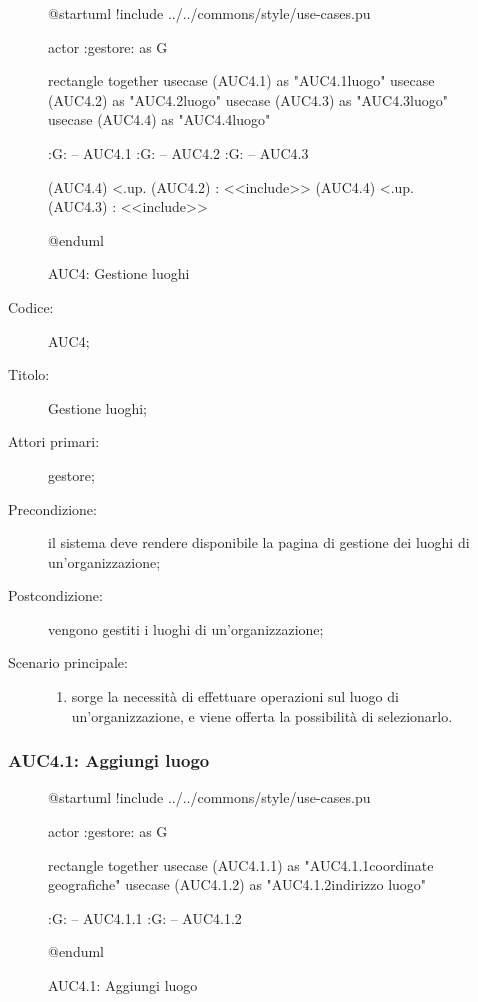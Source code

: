 
\begin{figure}[H]
  \centering
  \begin{plantuml}
  @startuml
  !include ../../commons/style/use-cases.pu

  actor :gestore: as G

  rectangle {
    together {
      usecase (AUC4.1) as "AUC4.1\nAggiungi luogo"
      usecase (AUC4.2) as "AUC4.2\nEliminazione luogo"
      usecase (AUC4.3) as "AUC4.3\nModifica luogo"
    }
    usecase (AUC4.4) as "AUC4.4\nSeleziona luogo"
  }

  :G: -- AUC4.1
  :G: -- AUC4.2
  :G: -- AUC4.3

  (AUC4.4) <.up. (AUC4.2) : <<include>>
  (AUC4.4) <.up. (AUC4.3) : <<include>>

  @enduml
  \end{plantuml}
  \caption{AUC4: Gestione luoghi}%
  \label{fig:AUC4}
\end{figure}

\begin{description}
  \item[Codice:] AUC4;
  \item[Titolo:] Gestione luoghi;
  \item[Attori primari:] gestore;
  \item[Precondizione:] il sistema deve rendere disponibile la pagina di gestione dei luoghi di un'organizzazione;
  \item[Postcondizione:] vengono gestiti i luoghi di un'organizzazione;
  \item[Scenario principale:]
  \begin{enumerate}
    \item sorge la necessità di effettuare operazioni sul luogo di un'organizzazione, e viene offerta la possibilità di selezionarlo.
  \end{enumerate}
\end{description}

\subsubsection{AUC4.1: Aggiungi luogo}%
\label{subs:AUC4.1}

\begin{figure}[H]
  \centering
  \begin{plantuml}
  @startuml
  !include ../../commons/style/use-cases.pu

  actor :gestore: as G

  rectangle {
    together {
      usecase (AUC4.1.1) as "AUC4.1.1\nInserisci coordinate geografiche"
      usecase (AUC4.1.2) as "AUC4.1.2\nInserisci indirizzo luogo"
    }
  }

  :G: -- AUC4.1.1
  :G: -- AUC4.1.2

  @enduml
  \end{plantuml}
  \caption{AUC4.1: Aggiungi luogo}%
  \label{fig:AUC4.1}
\end{figure}

